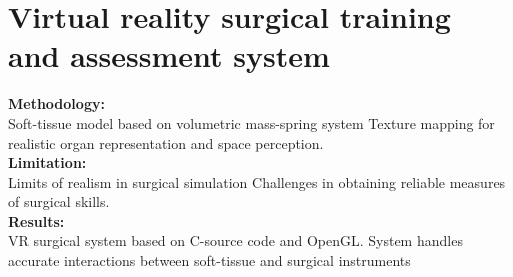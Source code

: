 \section{Virtual reality surgical training and assessment system\cite{JournalArticle3}\cite{JournalArticle7}}
\textbf{Methodology:}\\ Soft-tissue model based on volumetric mass-spring system
Texture mapping for realistic organ representation and space perception.\\
\textbf{Limitation:}\\ Limits of realism in surgical simulation Challenges in obtaining reliable measures of surgical skills.\\
\textbf{Results:}\\ VR surgical system based on C-source code and OpenGL.
System handles accurate interactions between soft-tissue and surgical instruments